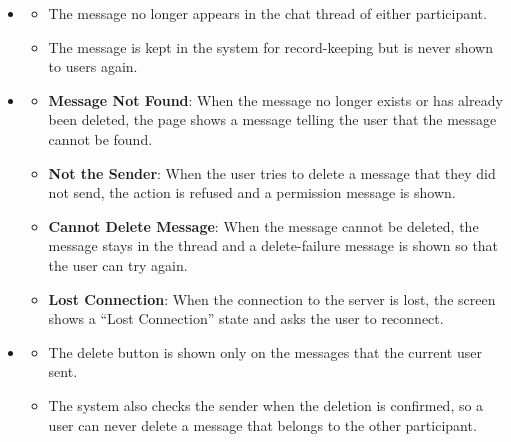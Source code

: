 \begin{itemize}[leftmargin=1.6em,topsep=4pt,itemsep=3pt,parsep=0pt,label=$\bullet$]
        \begin{itemize}[leftmargin=2.2em,topsep=2pt,itemsep=3pt,parsep=0pt,label=$\circ$]
            \item \textbf{Delete a File Message}: When the deleted message contains a file, the whole file message is removed from the thread in the same way.
            \item \textbf{Message Already Deleted}: When the message has already been deleted, the delete button is not available for it.
        \end{itemize}
    \item {}

        \begin{itemize}[leftmargin=2.2em,topsep=2pt,itemsep=3pt,parsep=0pt,label=$\circ$]
            \item The message no longer appears in the chat thread of either participant.
            \item The message is kept in the system for record-keeping but is never shown to users again.
        \end{itemize}
    \item {}

        \begin{itemize}[leftmargin=2.2em,topsep=2pt,itemsep=3pt,parsep=0pt,label=$\circ$]
            \item \textbf{Message Not Found}: When the message no longer exists or has already been deleted, the page shows a message telling the user that the message cannot be found.
            \item \textbf{Not the Sender}: When the user tries to delete a message that they did not send, the action is refused and a permission message is shown.
            \item \textbf{Cannot Delete Message}: When the message cannot be deleted, the message stays in the thread and a delete-failure message is shown so that the user can try again.
            \item \textbf{Lost Connection}: When the connection to the server is lost, the screen shows a ``Lost Connection'' state and asks the user to reconnect.
        \end{itemize}
    \item {}

        \begin{itemize}[leftmargin=2.2em,topsep=2pt,itemsep=3pt,parsep=0pt,label=$\circ$]
            \item The delete button is shown only on the messages that the current user sent.
            \item The system also checks the sender when the deletion is confirmed, so a user can never delete a message that belongs to the other participant.
        \end{itemize}
\end{itemize}


